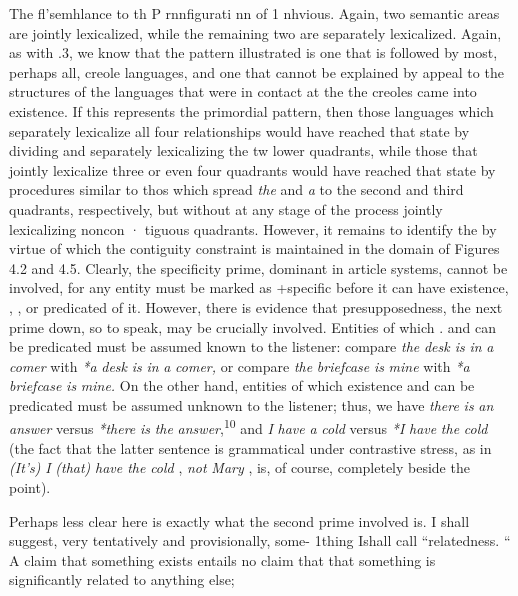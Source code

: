The fl'semhlance to th P rnnfigurati nn of  1 nhvious. Again, two semantic areas are jointly lexicalized, while the remaining two are separately lexicalized. Again, as with .3, we know that the pattern illustrated is one that is followed by most, perhaps all, creole languages, and one that cannot be explained by appeal to the structures of the languages that were in contact at the  the creoles came into existence. If this represents the primordial pattern, then those languages which separately lexicalize all four relationships would have reached that state by dividing and separately lexicalizing the tw lower quadrants, while those that jointly lexicalize three or even four quadrants would have reached that state by procedures similar to thos
which spread \textit{the} and \textit{a} to the second and third quadrants, respectively, but without at any stage of the process jointly lexicalizing noncon · tiguous quadrants.
However, it remains to identify the  by virtue of which the contiguity constraint is maintained in the domain of Figures 4.2 and 4.5. Clearly, the specificity prime, dominant in article systems, cannot be involved, for any entity must be marked as +specific before it can have existence, , , or  pre\-dicated of it. However, there is evidence that presupposedness, the next prime down, so to speak, may be crucially involved. Entities of which  . and  can be predicated must be assumed known to the listener: compare \textit{the} \textit{desk is} \textit{in} \textit{a} \textit{comer} with \textit{*a} \textit{desk} \textit{is} \textit{in} \textit{a} \textit{comer,} or compare \textit{the} \textit{briefcase} \textit{is} \textit{mine} with \textit{*a} \textit{briefcase} \textit{is} \textit{mine.} On the other hand, entities of which existence and  can be predicated must be assumed unknown to the listener; thus, we have \textit{there} \textit{is} \textit{an} \textit{answer} versus \textit{*there} \textit{is} \textit{the} \textit{answer},\textsuperscript{1}\textsuperscript{0 }and \textit{I} \textit{have} \textit{a} \textit{cold} versus \textit{*I} \textit{have} \textit{the} \textit{cold} (the fact that the latter sentence is grammatical under contrastive stress, as in \textit{(It's)} \textit{I }\textit{(that)} \textit{have the} \textit{cold} , \textit{not} \textit{Mary} , is, of course, completely beside the point). 

Perhaps less clear here is exactly what the second prime in\-volved is. I shall suggest, very tentatively and provisionally, some- 1thing Ishall call ``relatedness. `` A claim that something exists entails
no claim that that something is significantly related to anything else;

